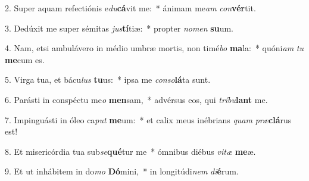 2. Super aquam refectiónis e\textit{du}\textbf{cá}vit me:~*  ánimam me\textit{am} \textit{con}\textbf{vér}tit.\

3. Dedúxit me super sémitas \textit{jus}\textbf{tí}tiæ:~*  propter \textit{no}\textit{men} \textbf{su}um.\

4. Nam, etsi ambulávero in médio umbræ mortis, non timé\textit{bo} \textbf{ma}la:~*  quóni\textit{am} \textit{tu} \textbf{me}cum es.\

5. Virga tua, et bácu\textit{lus} \textbf{tu}us:~*  ipsa me \textit{con}\textit{so}\textbf{lá}ta sunt.\

6. Parásti in conspéctu me\textit{o} \textbf{men}sam,~*  advérsus eos, qui \textit{trí}\textit{bu}\textbf{lant} me.\

7. Impinguásti in óleo ca\textit{put} \textbf{me}um:~*  et calix meus inébrians \textit{quam} \textit{præ}\textbf{clá}rus est!\

8. Et misericórdia tua sub\textit{se}\textbf{qué}tur me~*  ómnibus diébus \textit{vi}\textit{tæ} \textbf{me}æ.\

9. Et ut inhábitem in do\textit{mo} \textbf{Dó}mini,~*  in longitúdi\textit{nem} \textit{di}\textbf{é}rum.\

